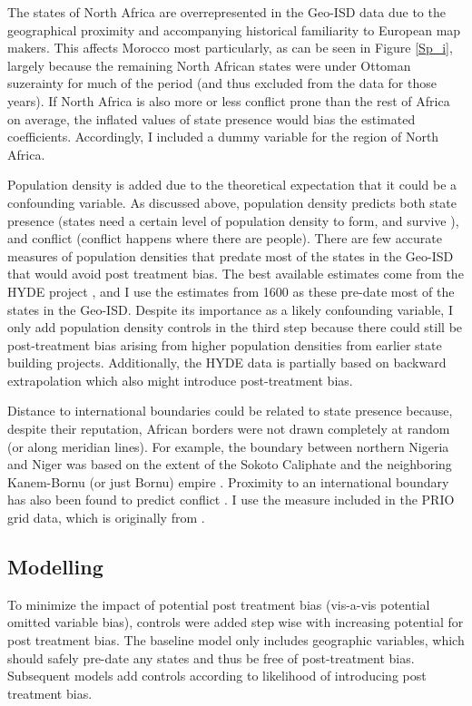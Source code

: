 \documentclass[12pt]{article}
\begin{document}
The states of North Africa are overrepresented in the Geo-ISD data due to the
geographical proximity and accompanying historical familiarity to European map
makers. This affects Morocco most particularly, as can be seen in Figure
\ref{Sp_i}, largely because the remaining North African states were under
Ottoman suzerainty for much of the period (and thus excluded from the data for
those years). If North Africa is also more or less conflict prone than the rest
of Africa on average, the inflated values of state presence would bias the
estimated coefficients. Accordingly, I included a dummy variable for the region
of North Africa.

Population density is added due to the theoretical expectation that it could be
a confounding variable. As discussed above, population density predicts both
state presence (states need a certain level of population density to form, and
survive \citep{scott2017against}), and conflict (conflict happens where there
are people). There are few accurate measures of population densities that
predate most of the states in the Geo-ISD that would avoid post treatment bias. The
best available estimates come from the HYDE project \citep{Goldewijk2016}, and I
use the estimates from 1600 as these pre-date most of the states in the Geo-ISD.
Despite its importance as a likely confounding variable, I only add population
density controls in the third step because there could still be post-treatment
bias arising from higher population densities from earlier state building projects.
Additionally, the HYDE data is partially based on backward extrapolation which
also might introduce post-treatment bias.

Distance to international boundaries could be related to state presence because,
despite their reputation, African borders were not drawn completely at random
(or along meridian lines). For example, the boundary between northern Nigeria and
Niger was based on the extent of the Sokoto Caliphate and the neighboring
Kanem-Bornu (or just Bornu) empire \citep{HiribarrenVincent2017AHoB}. Proximity
to an international boundary has also been found to predict conflict
\citep{Buhaug2002}. I use the measure included in the PRIO grid data, which is
originally from \citet{Weidmann2010a}.

\subsection{Modelling} \label{Modelling}

To minimize the impact of potential post treatment bias (vis-a-vis potential
omitted variable bias), controls were added step wise with increasing potential
for post treatment bias. The baseline model only includes geographic variables,
which should safely pre-date any states and thus be free of post-treatment bias.
Subsequent models add controls according to likelihood of introducing post
treatment bias.
\end{document}
